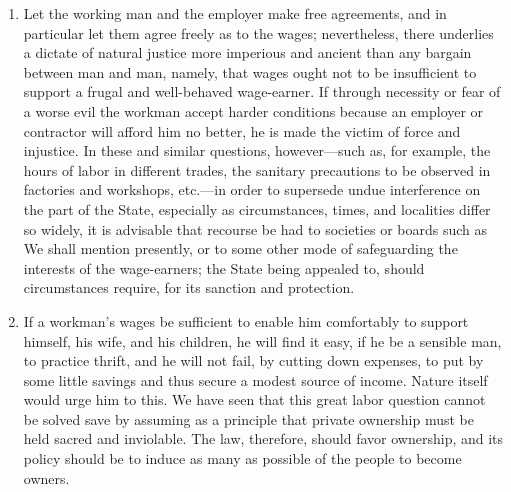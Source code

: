\documentclass{book}
\begin{document}
\begin{enumerate}
	\item Let the working man and the employer make free agreements, and in particular let them agree freely as to the wages; nevertheless, there underlies a dictate of natural justice more imperious and ancient than any bargain between man and man, namely, that wages ought not to be insufficient to support a frugal and well-behaved wage-earner. If through necessity or fear of a worse evil the workman accept harder conditions because an employer or contractor will afford him no better, he is made the victim of force and injustice. In these and similar questions, however—such as, for example, the hours of labor in different trades, the sanitary precautions to be observed in factories and workshops, etc.—in order to supersede undue interference on the part of the State, especially as circumstances, times, and localities differ so widely, it is advisable that recourse be had to societies or boards such as We shall mention presently, or to some other mode of safeguarding the interests of the wage-earners; the State being appealed to, should circumstances require, for its sanction and protection.


	\item If a workman’s wages be sufficient to enable him comfortably to support himself, his wife, and his children, he will find it easy, if he be a sensible man, to practice thrift, and he will not fail, by cutting down expenses, to put by some little savings and thus secure a modest source of income. Nature itself would urge him to this. We have seen that this great labor question cannot be solved save by assuming as a principle that private ownership must be held sacred and inviolable. The law, therefore, should favor ownership, and its policy should be to induce as many as possible of the people to become owners.



\end{enumerate}
\end{document}
